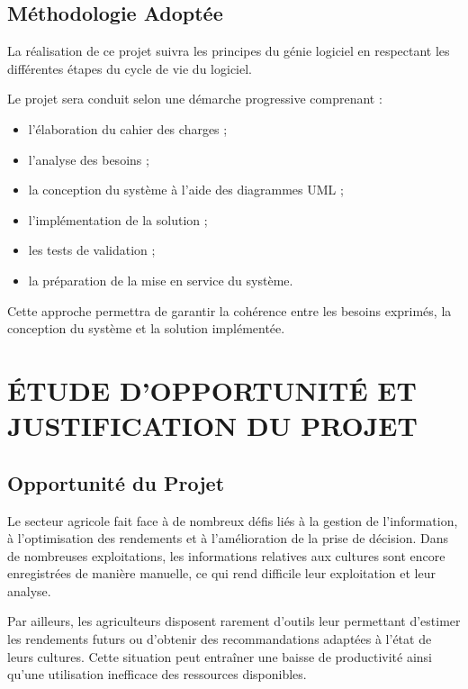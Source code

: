 \documentclass[12pt,a4paper]{report}
\begin{document}
\section{Méthodologie Adoptée}\label{muxe9thodologie-adoptuxe9e}

La réalisation de ce projet suivra les principes du génie logiciel en
respectant les différentes étapes du cycle de vie du logiciel.

Le projet sera conduit selon une démarche progressive comprenant :

\begin{itemize}
\item
  l'élaboration du cahier des charges ;
\item
  l'analyse des besoins ;
\item
  la conception du système à l'aide des diagrammes UML ;
\item
  l'implémentation de la solution ;
\item
  les tests de validation ;
\item
  la préparation de la mise en service du système.
\end{itemize}

Cette approche permettra de garantir la cohérence entre les besoins
exprimés, la conception du système et la solution implémentée.

\chapter{ÉTUDE D'OPPORTUNITÉ ET JUSTIFICATION DU
PROJET}\label{chapitre-2-uxe9tude-dopportunituxe9-et-justification-du-projet}

\section{Opportunité du Projet}\label{opportunituxe9-du-projet}

Le secteur agricole fait face à de nombreux défis liés à la gestion de
l'information, à l'optimisation des rendements et à l'amélioration de la
prise de décision. Dans de nombreuses exploitations, les informations
relatives aux cultures sont encore enregistrées de manière manuelle, ce
qui rend difficile leur exploitation et leur analyse.

Par ailleurs, les agriculteurs disposent rarement d'outils leur
permettant d'estimer les rendements futurs ou d'obtenir des
recommandations adaptées à l'état de leurs cultures. Cette situation
peut entraîner une baisse de productivité ainsi qu'une utilisation
inefficace des ressources disponibles.
\end{document}
